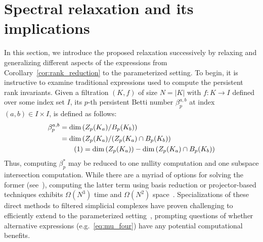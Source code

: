 \documentclass[10pt]{article}
\numberwithin{equation}{section}
\newcommand{\+}{%
	\raisebox{0.18ex}{\scaleobj{0.55}{+}}
}
\theoremstyle{definition}
\theoremstyle{definition}
\newcommand\numberthis{\addtocounter{equation}{1}\tag{\theequation}}
\begin{document}
\section{Spectral relaxation and its implications}\label{sec:spectral_sec}
In this section, we introduce the proposed relaxation successively by relaxing and generalizing different aspects of the expressions from Corollary~\ref{cor:rank_reduction} to the parameterized setting. To begin, it is instructive to examine  traditional expressions used to compute the persistent rank invariants. 
Given a filtration $(K,f)$ of size $N = \lvert K\rvert$ with $f: K \to I$ defined over some index set $I$, its $p$-th persistent Betti number $\beta_p^{a,b}$ at index $(a,b) \in I \times I$, is defined as follows: 
\begin{align*} \label{eq:pbn}
	\centering
	\beta_p^{a,b } &= \mathrm{dim} \left ( Z_p(K_a) / B_p(K_b) \right ) \\
	& = \mathrm{dim} \left( Z_p(K_a) / (Z_p(K_a) \cap B_p(K_b) \right) \\
	& \numberthis = \mathrm{dim} \left( Z_p(K_a) \right) - \mathrm{dim}\left( Z_p(K_a) \cap B_p(K_b) \right ) 
\end{align*}
Thus, computing $\beta_p^\ast$ may be reduced to one nullity computation and one subspace intersection computation. %
While there are a myriad of options for solving the former (see~\cite{chen2011output}), computing the latter term using basis reduction or projector-based techniques exhibits $\Omega(N^3)$ time and $\Omega(N^2)$ space~\cite{golub2013matrix}.
Specializations of these direct methods to filtered simplicial complexes have proven challenging to efficiently extend to the parameterized setting~\cite{piekenbrock2021move}, prompting questions of whether alternative expressions (e.g.~\eqref{eq:mu_four}) have any potential computational benefits.
\end{document}
